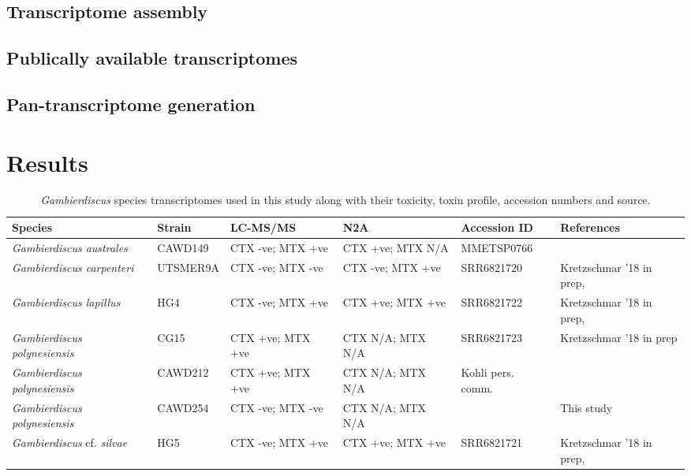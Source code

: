 \documentclass[12pt]{article}
\begin{document}
\subsection*{Transcriptome assembly}

\subsection*{Publically available transcriptomes}

\subsection*{Pan-transcriptome generation}
\newpage
\section*{Results}
\FloatBarrier
\begin{table}
\caption{\emph{Gambierdiscus} species transcriptomes used in this study along with their toxicity, toxin profile, accession numbers and source.}
\begin{tabular}{ | p{3cm} | p{2cm} | p{2.5cm} | p{2.5cm} | p{2cm} | p{2cm}|}
\hline
\textbf{Species} & \textbf{Strain}& \textbf{LC-MS/MS} & \textbf{N2A
} & \textbf{Accession ID} & \textbf{References} \\
\hline
\textit{Gambierdiscus australes}&CAWD149& CTX -ve; MTX +ve&CTX +ve; MTX N/A&MMETSP0766&\cite{keeling2014marine,rhodes2010toxic,rhodes2014production}\\
\hline
\textit{Gambierdiscus carpenteri}&UTSMER9A&CTX -ve; MTX -ve&CTX -ve; MTX +ve&SRR6821720
&Kretzschmar '18 in prep, \cite{larsson2018toxicology}\\
\hline
\textit{Gambierdiscus lapillus}&HG4&CTX -ve; MTX +ve&CTX +ve; MTX +ve&SRR6821722
&Kretzschmar '18 in prep, \cite{larsson2018toxicology,kretzschmar2017characterization}\\
\hline
\textit{Gambierdiscus polynesiensis}&CG15&CTX +ve; MTX +ve&CTX N/A; MTX N/A&SRR6821723
&Kretzschmar '18 in prep\\
\hline
\textit{Gambierdiscus polynesiensis}&CAWD212&CTX +ve; MTX +ve&CTX N/A; MTX N/A&Kohli pers. comm.&\cite{rhodes2014production}\\
\hline
\textit{Gambierdiscus polynesiensis}&CAWD254&CTX -ve; MTX -ve&CTX N/A; MTX N/A&&This study\\
\hline
\textit{Gambierdiscus} cf. \textit{silvae}&HG5&CTX -ve; MTX +ve&CTX +ve; MTX +ve&SRR6821721
&Kretzschmar '18 in prep, \cite{larsson2018toxicology,kretzschmar2017characterization}\\
\hline
\end{tabular}
\end{table}
\FloatBarrier
\end{document}
